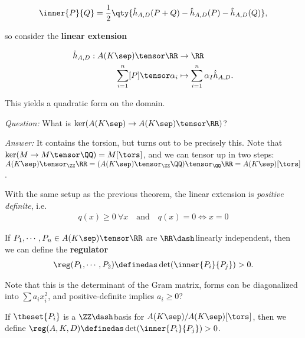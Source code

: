 \begin{align*}
\inner{P}{Q} = \frac 1 2 \qty { \hat h_{A,D}(P+Q) - \hat h_{A, D}(P) - \hat h_{A, D}(Q) }
,\end{align*}

so consider the \textbf{linear extension}

\begin{align*}
\hat h_{A, D}: A(K\sep) \tensor \RR &\to \RR \\
\sum_{i=1}^n [P]\tensor \alpha_i &\mapsto \sum_{i=1}^n \alpha_I \hat h_{A, D}
.\end{align*}

\begin{description}
\tightlist
\item[Exercise]
This yields a quadratic form on the domain.
\end{description}

\emph{Question:} What is \(\ker(A(K\sep) \to A(K\sep) \tensor \RR)\)?

\emph{Answer:} It contains the torsion, but turns out to be precisely
this. Note that \(\ker(M \to M\tensor \QQ) = M[\tors]\), and we can
tensor up in two steps:
\(A(K\sep) \tensor_\ZZ \RR = (A(K\sep) \tensor_\ZZ \QQ) \tensor_\QQ \RR = A(K\sep)[\tors]\).

\begin{description}
\tightlist
\item[Theorem (Linear Extension is Positive Definite)]
With the same setup as the previous theorem, the linear extension is
\emph{positive definite}, i.e.~
\begin{align*}
q(x) \geq 0 ~\forall x \quad\text{and}\quad q(x) = 0 \iff x=0
\end{align*}
\item[Definition (Regulator)]
If \(P_1, \cdots, P_n \in A(K\sep) \tensor \RR\) are
\(\RR\dash\)linearly independent, then we can define the
\textbf{regulator}
\begin{align*}\reg(P_1, \cdots, P_2) \definedas \det(\inner{P_i}{P_j}) > 0.\end{align*}
\end{description}

Note that this is the determinant of the Gram matrix, forms can be
diagonalized into \(\sum a_i x_i^2\), and positive-definite implies
\(a_i \geq 0\)?

If \(\theset{P_i}\) is a \(\ZZ\dash\)basis for
\(A(K\sep) / A(K\sep) [\tors]\), then we define
\(\reg(A, K, D) \definedas \det(\inner{P_i}{P_j}) > 0\).

